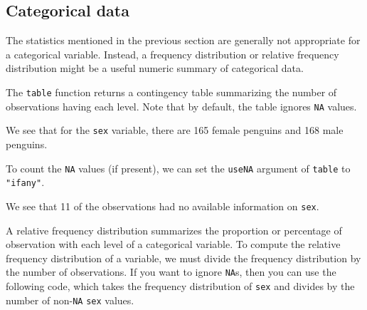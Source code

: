 \documentclass[
]{book}
\newenvironment{Shaded}{\begin{snugshade}}{\end{snugshade}}
\newcommand{\AttributeTok}[1]{\textcolor[rgb]{0.77,0.63,0.00}{#1}}
\newcommand{\DocumentationTok}[1]{\textcolor[rgb]{0.56,0.35,0.01}{\textbf{\textit{#1}}}}
\newcommand{\FunctionTok}[1]{\textcolor[rgb]{0.00,0.00,0.00}{#1}}
\newcommand{\NormalTok}[1]{#1}
\newcommand{\SpecialCharTok}[1]{\textcolor[rgb]{0.00,0.00,0.00}{#1}}
\newcommand{\StringTok}[1]{\textcolor[rgb]{0.31,0.60,0.02}{#1}}
\theoremstyle{definition}
\theoremstyle{definition}
\theoremstyle{definition}
\theoremstyle{definition}
\theoremstyle{remark}
\begin{document}
\hypertarget{categorical-data}{%
\subsection{Categorical data}\label{categorical-data}}

The statistics mentioned in the previous section are generally not appropriate for a categorical variable. Instead, a frequency distribution or relative frequency distribution might be a useful numeric summary of categorical data.

The \texttt{table} function returns a contingency table summarizing the number of observations having each level. Note that by default, the table ignores \texttt{NA} values.

We see that for the \texttt{sex} variable, there are 165 female penguins and 168 male penguins.

\begin{Shaded}
\end{Shaded}

To count the \texttt{NA} values (if present), we can set the \texttt{useNA} argument of \texttt{table} to \texttt{"ifany"}.

We see that 11 of the observations had no available information on \texttt{sex}.

\begin{Shaded}
\end{Shaded}

A relative frequency distribution summarizes the proportion or percentage of observation with each level of a categorical variable. To compute the relative frequency distribution of a variable, we must divide the frequency distribution by the number of observations. If you want to ignore \texttt{NA}s, then you can use the following code, which takes the frequency distribution of \texttt{sex} and divides by the number of non-\texttt{NA} \texttt{sex} values.
\end{document}
